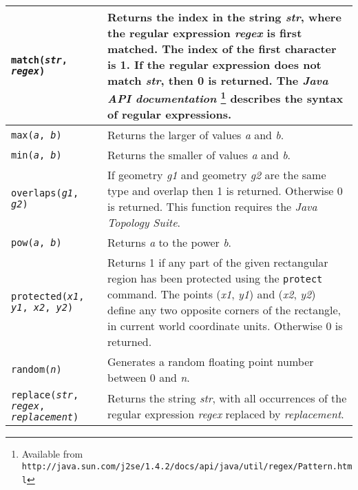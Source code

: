 \begin{longtable}{|p{5cm}|p{7cm}|}
\hline

\texttt{match(\textit{str}, \textit{regex})} &
Returns the index in the string \textit{str}, where the regular expression
\textit{regex} is first matched.  The index of the first character is 1.
If the regular expression does not match \textit{str}, then 0 is returned.
The \textit{Java API documentation}
\footnote{Available from
\texttt{http://java.sun.com/j2se/1.4.2/docs/api/java/util/regex/Pattern.html}}
describes the syntax of regular expressions. \\

\hline

\texttt{max(\textit{a}, \textit{b})} &
Returns the larger of values \textit{a} and \textit{b}. \\

\hline

\texttt{min(\textit{a}, \textit{b})} &
Returns the smaller of values \textit{a} and \textit{b}. \\

\hline

\texttt{overlaps(\textit{g1}, \textit{g2})} &
If geometry \textit{g1} and geometry \textit{g2}
are the same type
and overlap
then 1 is returned.  Otherwise 0 is returned.
This function requires the \textit{Java Topology Suite}. \\

\hline

\texttt{pow(\textit{a}, \textit{b})} &
Returns \textit{a} to the power \textit{b}. \\

\hline

\texttt{protected(\textit{x1}, \textit{y1}, \textit{x2}, \textit{y2})} &
Returns 1 if any part of the given rectangular region
has been protected using the \texttt{protect}
command.
The points
(\textit{x1}, \textit{y1}) and (\textit{x2}, \textit{y2}) define
any two opposite corners of the rectangle, in current world coordinate
units.
Otherwise 0 is returned. \\

\hline

\texttt{random(\textit{n})} &
Generates a random floating point number between 0 and \textit{n}. \\

\hline

\texttt{replace(\textit{str}, \textit{regex}, \textit{replacement})} &
Returns the string \textit{str}, with all occurrences of the regular
expression \textit{regex} replaced by \textit{replacement}. \\


\end{longtable}

